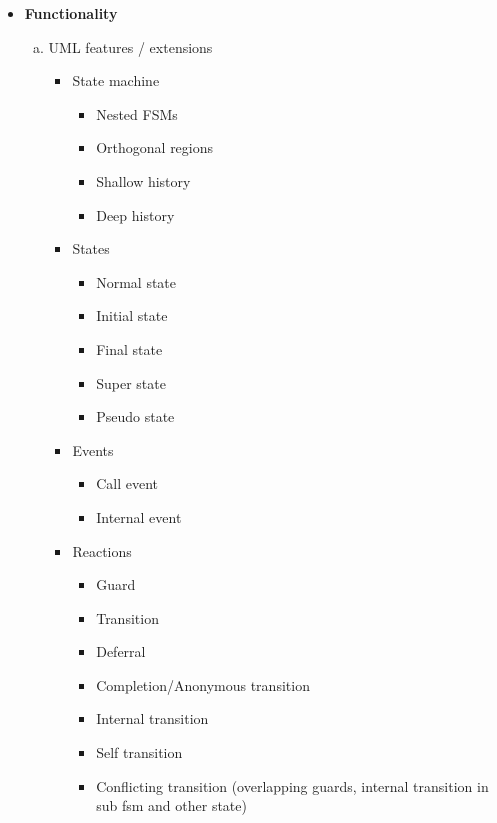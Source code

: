 \begin{itemize}
\item \textbf{Functionality}
    \begin{enumerate}[a)]
        \item UML features / extensions
            \begin{itemize}

                \item State machine
                    \begin{itemize}
                        \item Nested FSMs
                        \item Orthogonal regions
                        \item Shallow history
                        \item Deep history
                    \end{itemize}

                \item States
                    \begin{itemize}
                        \item Normal state
                        \item Initial state
                        \item Final state
                        \item Super state
                        \item Pseudo state
                    \end{itemize}

                \item Events
                    \begin{itemize}
                        \item Call event
                        \item Internal event
                    \end{itemize}

                \item Reactions
                    \begin{itemize}
                        \item Guard
                        \item Transition
                        \item Deferral
                        \item Completion/Anonymous transition
                        \item Internal transition
                        \item Self transition
                        \item Conflicting transition (overlapping guards, internal transition in sub fsm and other state)
                    \end{itemize}


\end{itemize}
\end{enumerate}
\end{itemize}
